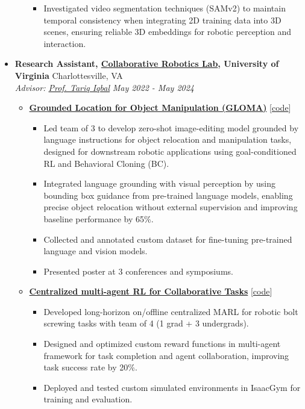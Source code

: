 \documentclass[letterpaper,11pt]{article}
\newcommand{\linkhref}[2]{\textcolor{linkblue}{\href{#1}{#2}}}
\newcommand{\Date}[1]{\textit{\small #1}}
\newcommand{\heading}[4]{
  \textbf{#1} \hfill #2 \\
  \textit{\small#3} \hfill \Date{#4}
}
\begin{document}
\begin{itemize}[label={}, leftmargin=0pt]
\begin{itemize}
\begin{itemize}
                  \item Investigated video segmentation techniques (SAMv2) to maintain temporal consistency when integrating 2D training data into 3D scenes, ensuring reliable 3D embeddings for robotic perception and interaction.
                \end{itemize}
        \end{itemize}
  \item \heading{Research Assistant, \href{https://www.collabrobotics.com/}{Collaborative Robotics Lab}, University of Virginia}{Charlottesville, VA}
        {Advisor: \href{https://www.tiqbal.com/}{Prof. Tariq Iqbal}}{May 2022 - May 2024}
        \begin{itemize}
          \item \href{https://github.com/branyang02/GLOMA}{\textbf{Grounded Location for Object Manipulation (GLOMA)}} [\linkhref{https://github.com/branyang02/GLOMA}{code}]
                \begin{itemize}
                  \item Led team of 3 to develop zero-shot image-editing model grounded by language instructions for object relocation and manipulation tasks, designed for downstream robotic applications using goal-conditioned RL and Behavioral Cloning (BC).
                  \item Integrated language grounding with visual perception by using bounding box guidance from pre-trained language models, enabling precise object relocation without external supervision and improving baseline performance by 65\%.
                  \item Collected and annotated custom dataset for fine-tuning pre-trained language and vision models.
                  \item Presented poster at 3 conferences and symposiums.
                \end{itemize}
          \item \textbf{\href{https://github.com/branyang02/PandaFactory}{Centralized multi-agent RL for Collaborative Tasks}} [\linkhref{https://github.com/branyang02/PandaFactory}{code}]
                \begin{itemize}
                  \item Developed long-horizon on/offline centralized MARL for robotic bolt screwing tasks with team of 4 (1 grad + 3 undergrads).
                  \item Designed and optimized custom reward functions in multi-agent framework for task completion and agent collaboration, improving task success rate by 20\%.
                  \item Deployed and tested custom simulated environments in IsaacGym for training and evaluation.
                \end{itemize}
        \end{itemize}
\end{itemize}
\end{document}
